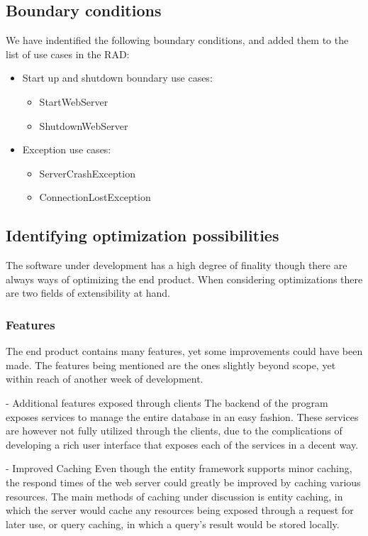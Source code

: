 \subsection{Boundary conditions}

We have indentified the following boundary conditions, and added them to the list of use cases in the RAD:

\begin{itemize}
	\item Start up and shutdown boundary use cases:
	\begin{itemize}
			\item StartWebServer
			\item ShutdownWebServer
	\end{itemize}
	\item Exception use cases:
	\begin{itemize}
			\item ServerCrashException
			\item ConnectionLostException
	\end{itemize}
\end{itemize}

\subsection{Identifying optimization possibilities}

The software under development has a high degree of finality though there are always ways of optimizing the end product.
When considering optimizations there are two fields of extensibility at hand.

\subsubsection{Features}

The end product contains many features, yet some improvements could have been made.
The features being mentioned are the ones slightly beyond scope, yet within reach of another week of development.

- Additional features exposed through clients
The backend of the program exposes services to manage the entire database in an easy fashion. These services are however not fully utilized through the clients, due to the complications of developing a rich user interface that exposes each of the services in a decent way.

- Improved Caching
Even though the entity framework supports minor caching, the respond times of the web server could greatly be improved by caching various resources.
The main methods of caching under discussion is entity caching, in which the server would cache any resources being exposed through a request for later use, or query caching, in which a query's result would be stored locally.

